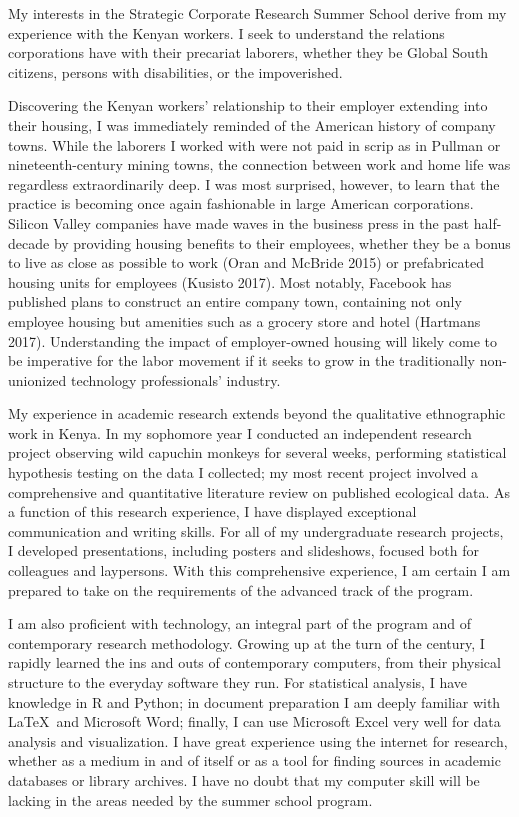 My interests in the Strategic Corporate Research Summer School derive from my experience
with the Kenyan workers. I seek to understand the relations corporations have with their
precariat laborers, whether they be Global South citizens, persons with disabilities, or
the impoverished. 

Discovering the Kenyan workers’ relationship to their employer extending into their housing,
I was immediately reminded of the American history of company towns. While the laborers I
worked with were not paid in scrip as in Pullman or nineteenth-century mining towns,
the connection between work and home life was regardless extraordinarily deep.
I was most surprised, however, to learn that the practice is becoming once again fashionable
in large American corporations. Silicon Valley companies have made waves in the business
press in the past half-decade by providing housing benefits to their employees,
whether they be a bonus to live as close as possible to work (Oran and McBride 2015)
or prefabricated housing units for employees (Kusisto 2017).
Most notably, Facebook has published plans to construct an entire company town,
containing not only employee housing but amenities such as a grocery store and hotel (Hartmans 2017).
Understanding the impact of employer-owned housing will likely come to be imperative
for the labor movement if it seeks to grow in the traditionally non-unionized
technology professionals’ industry.

My experience in academic research extends beyond the qualitative ethnographic work in Kenya.
In my sophomore year I conducted an independent research project observing wild
capuchin monkeys for several weeks, performing statistical hypothesis testing on the data I collected;
my most recent project involved a comprehensive and quantitative
literature review on published ecological data.
As a function of this research experience, I have displayed exceptional communication and writing skills.
For all of my undergraduate research projects, I developed presentations,
including posters and slideshows, focused both for colleagues and laypersons.
With this comprehensive experience, I am certain I am prepared to take on the
requirements of the advanced track of the program.

I am also proficient with technology, an integral part of the program and of
contemporary research methodology. Growing up at the turn of the century,
I rapidly learned the ins and outs of contemporary computers, from their physical
structure to the everyday software they run. For statistical analysis,
I have knowledge in R and Python; in document preparation I am deeply familiar with \LaTeX\ 
and Microsoft Word; finally, I can use Microsoft Excel very well for data analysis and visualization.
I have great experience using the internet for research, whether as a medium in and of itself
or as a tool for finding sources in academic databases or library archives.
I have no doubt that my computer skill will be lacking in the areas needed by the summer school program.

